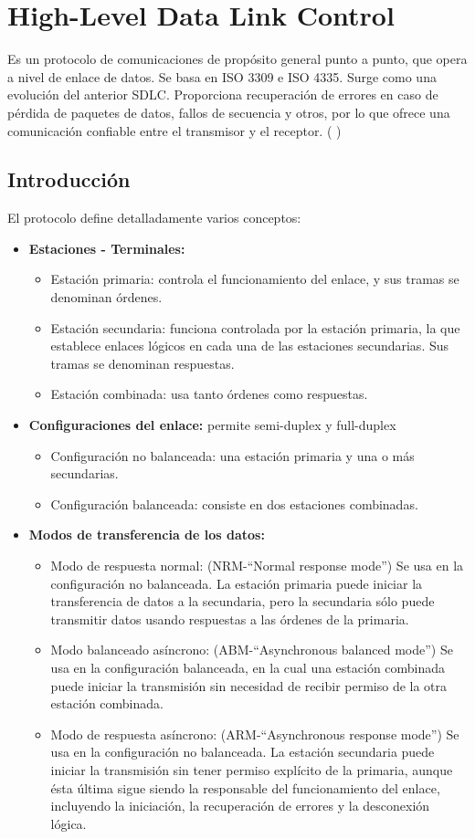 \documentclass[withindex,glossary]{cam-thesis}
\begin{document}
\section{High-Level Data Link Control}
Es un protocolo de comunicaciones de propósito general punto a punto, que opera a nivel de enlace de datos. Se basa en ISO 3309 e ISO 4335. Surge como una evolución del anterior SDLC. Proporciona recuperación de errores en caso de pérdida de paquetes de datos, fallos de secuencia y otros, por lo que ofrece una comunicación confiable entre el transmisor y el receptor. (\cite{RFC2687} \cite{RFC1662})

\subsection{Introducción}
El protocolo define detalladamente varios conceptos:
\begin{itemize}
\item \textbf{Estaciones - Terminales:}
	\begin{itemize}[label={--}]
	\item Estación primaria: controla el funcionamiento del enlace, y sus tramas se denominan órdenes.
    \item Estación secundaria: funciona controlada por la estación primaria, la que establece enlaces lógicos en cada una de las estaciones secundarias. Sus tramas se denominan respuestas.
    \item Estación combinada: usa tanto órdenes como respuestas.
	\end{itemize}
\item \textbf{Configuraciones del enlace:} permite semi-duplex y full-duplex
	\begin{itemize}[label={--}]
	\item Configuración no balanceada: una estación primaria y una o más secundarias.
    \item Configuración balanceada: consiste en dos estaciones combinadas.
	\end{itemize}
\item \textbf{Modos de transferencia de los datos:}
	\begin{itemize}[label={--}]
	\item Modo de respuesta normal: (NRM-“Normal response mode”) Se usa en la configuración no balanceada. La estación primaria puede iniciar la transferencia de datos a la secundaria, pero la secundaria sólo puede transmitir datos usando respuestas a las órdenes de la primaria.
    \item Modo balanceado asíncrono: (ABM-“Asynchronous balanced mode”) Se usa en la configuración balanceada, en la cual una estación combinada puede iniciar la transmisión sin necesidad de recibir permiso de la otra estación combinada.
    \item Modo de respuesta asíncrono: (ARM-“Asynchronous response mode”) Se usa en la configuración no balanceada. La estación secundaria puede iniciar la transmisión sin tener permiso explícito de la primaria, aunque ésta última sigue siendo la responsable del funcionamiento del enlace, incluyendo la iniciación, la recuperación de errores y la desconexión lógica.
	\end{itemize}
\end{itemize}
\end{document}
